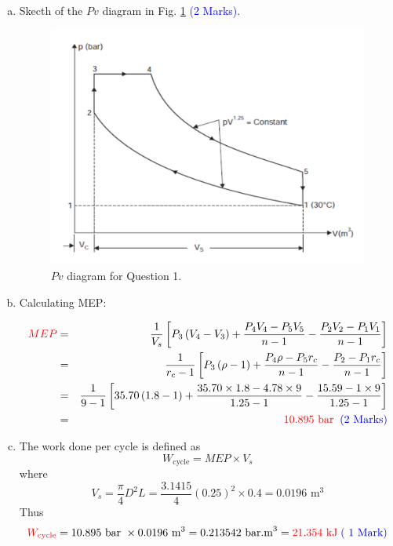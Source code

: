 \documentclass[12pt,twoside]{report}
\newcommand{\frc}{\displaystyle\frac}
\begin{document}
\begin{description}
\begin{enumerate}[(a)]
\begin{description}
\end{description}

\item Skecth of the $Pv$ diagram in Fig. \ref{dualcycle} \textcolor{blue}{(2 Marks)}.
\begin{center}
\begin{figure}[h]
\label{dualcycle}
\includegraphics[width=10.cm,clip]{./Pics/Exam_DualCycle}
\caption{$Pv$ diagram for Question 1.}
\end{figure}
\end{center}


\item Calculating MEP:

\begin{eqnarray}
\textcolor{red}{MEP} &=& \frc{1}{V_{s}}\left[P_{3}\left(V_{4}-V_{3}\right) + \frc{P_{4}V_{4}-P_{5}V_{5}}{n-1} - \frc{P_{2}V_{2}-P_{1}V_{1}}{n-1}\right] \nonumber \\
    &=& \frc{1}{r_{c}-1} \left[ P_{3}\left(\rho-1\right) + \frc{P_{4}\rho-P_{5}r_{c}}{n-1} - \frc{P_{2}-P_{1}r_{c}}{n-1}\right] \nonumber \\
    &=& \frc{1}{9-1} \left[ 35.70\left(1.8-1\right) + \frc{35.70\times 1.8 - 4.78 \times 9}{1.25 - 1} - \frc{15.59 - 1\times 9}{1.25-1}\right] \nonumber \\
    &=& \textcolor{red}{10.895\text{ bar}}\;\;\textcolor{blue}{\text{(2 Marks)}} \nonumber 
\end{eqnarray}


\item The work done per cycle is defined as
\begin{displaymath}
W_{\text{cycle}} = MEP \times V_{s}
\end{displaymath}
where
\begin{displaymath}
V_{s} = \frc{\pi}{4} D^{2}L= \frc{3.1415}{4}\left(0.25\right)^{2}\times 0.4 = 0.0196\text{ m}^{3}
\end{displaymath}
Thus
\begin{displaymath}
\textcolor{red}{W_{\text{cycle}}} = 10.895\text{ bar }\times 0.0196\text{ m}^{3} = 0.213542 \text{ bar.m}^{3} = \textcolor{red}{21.354 \text{ kJ}}\;\textcolor{blue}{\text{( 1 Mark)}}
\end{displaymath}


\end{enumerate}
\end{description}
\end{document}
